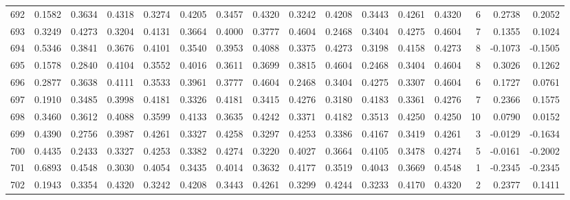 \begin{tabular}{lrrrrrrrrrrrrrrr}
692 &      0.1582 &  0.3634 &  0.4318 &  0.3274 &  0.4205 &  0.3457 &  0.4320 &  0.3242 &  0.4208 &  0.3443 &   0.4261 &     0.4320 &      6 &                    0.2738 &                     0.2052 \\
693 &      0.3249 &  0.4273 &  0.3204 &  0.4131 &  0.3664 &  0.4000 &  0.3777 &  0.4604 &  0.2468 &  0.3404 &   0.4275 &     0.4604 &      7 &                    0.1355 &                     0.1024 \\
694 &      0.5346 &  0.3841 &  0.3676 &  0.4101 &  0.3540 &  0.3953 &  0.4088 &  0.3375 &  0.4273 &  0.3198 &   0.4158 &     0.4273 &      8 &                   -0.1073 &                    -0.1505 \\
695 &      0.1578 &  0.2840 &  0.4104 &  0.3552 &  0.4016 &  0.3611 &  0.3699 &  0.3815 &  0.4604 &  0.2468 &   0.3404 &     0.4604 &      8 &                    0.3026 &                     0.1262 \\
696 &      0.2877 &  0.3638 &  0.4111 &  0.3533 &  0.3961 &  0.3777 &  0.4604 &  0.2468 &  0.3404 &  0.4275 &   0.3307 &     0.4604 &      6 &                    0.1727 &                     0.0761 \\
697 &      0.1910 &  0.3485 &  0.3998 &  0.4181 &  0.3326 &  0.4181 &  0.3415 &  0.4276 &  0.3180 &  0.4183 &   0.3361 &     0.4276 &      7 &                    0.2366 &                     0.1575 \\
698 &      0.3460 &  0.3612 &  0.4088 &  0.3599 &  0.4133 &  0.3635 &  0.4242 &  0.3371 &  0.4182 &  0.3513 &   0.4250 &     0.4250 &     10 &                    0.0790 &                     0.0152 \\
699 &      0.4390 &  0.2756 &  0.3987 &  0.4261 &  0.3327 &  0.4258 &  0.3297 &  0.4253 &  0.3386 &  0.4167 &   0.3419 &     0.4261 &      3 &                   -0.0129 &                    -0.1634 \\
700 &      0.4435 &  0.2433 &  0.3327 &  0.4253 &  0.3382 &  0.4274 &  0.3220 &  0.4027 &  0.3664 &  0.4105 &   0.3478 &     0.4274 &      5 &                   -0.0161 &                    -0.2002 \\
701 &      0.6893 &  0.4548 &  0.3030 &  0.4054 &  0.3435 &  0.4014 &  0.3632 &  0.4177 &  0.3519 &  0.4043 &   0.3669 &     0.4548 &      1 &                   -0.2345 &                    -0.2345 \\
702 &      0.1943 &  0.3354 &  0.4320 &  0.3242 &  0.4208 &  0.3443 &  0.4261 &  0.3299 &  0.4244 &  0.3233 &   0.4170 &     0.4320 &      2 &                    0.2377 &                     0.1411 \\

\end{tabular}
